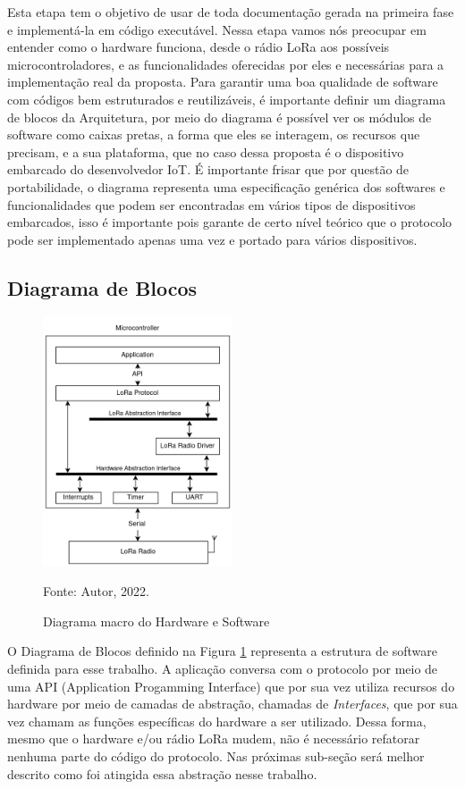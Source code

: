 Esta etapa tem o objetivo de usar de toda documentação gerada na primeira fase
e implementá-la em código executável. Nessa etapa vamos nós preocupar em entender
como o hardware funciona, desde o rádio LoRa aos possíveis microcontroladores, e
as funcionalidades oferecidas por eles e necessárias para a implementação real
da proposta. Para garantir uma boa qualidade de software com códigos bem estruturados
e reutilizáveis, é importante definir um diagrama de blocos da Arquitetura, por meio
do diagrama é possível ver os módulos de software como caixas pretas, a forma que
eles se interagem, os recursos que precisam, e a sua plataforma, que no caso dessa
proposta é o dispositivo embarcado do desenvolvedor IoT. É importante frisar que por
questão de portabilidade, o diagrama representa uma especificação genérica dos softwares
e funcionalidades que podem ser encontradas em vários tipos de dispositivos embarcados,
isso é importante pois garante de certo nível teórico que o protocolo pode ser implementado
apenas uma vez e portado para vários dispositivos.

\subsection{Diagrama de Blocos}

\begin{figure}[h]
    \centering
	\caption{Diagrama macro do Hardware e Software}
    \includegraphics[width=0.5\textwidth,height=0.5\textheight,keepaspectratio]{img/blk.drawio.png}
    \label{fig:blk}
    
    Fonte: Autor, 2022.
\end{figure}

O Diagrama de Blocos definido na Figura \ref{fig:blk} representa a estrutura de software
definida para esse trabalho. A aplicação conversa com o protocolo por meio de uma API
(Application Progamming Interface) que por sua vez utiliza recursos do hardware por
meio de camadas de abstração, chamadas de \textit{Interfaces}, que por sua vez chamam 
as funções específicas do hardware a ser utilizado.
Dessa forma, mesmo que o hardware e/ou rádio LoRa mudem, não é necessário refatorar
nenhuma parte do código do protocolo. Nas próximas sub-seção será melhor descrito como
foi atingida essa abstração nesse trabalho.

